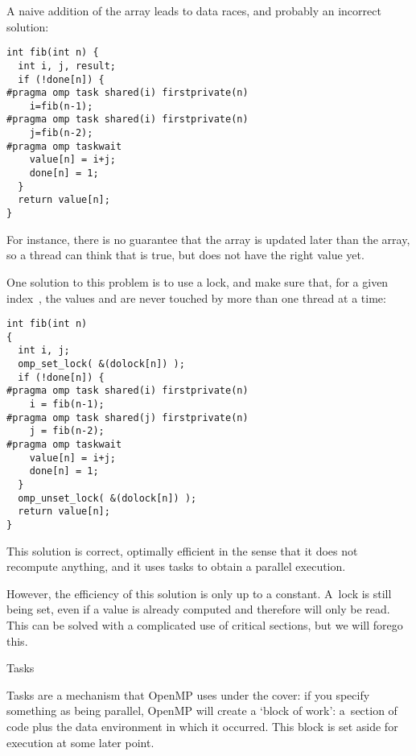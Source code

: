 A naive addition of the  array leads to data races, and probably an
incorrect solution:
\begin{verbatim}
int fib(int n) {
  int i, j, result;
  if (!done[n]) {
#pragma omp task shared(i) firstprivate(n)
    i=fib(n-1);
#pragma omp task shared(i) firstprivate(n)
    j=fib(n-2);
#pragma omp taskwait
    value[n] = i+j;
    done[n] = 1;
  }
  return value[n];
}
\end{verbatim}
For instance, there is no guarantee that the  array is updated
later than the  array, so a thread can think that 
is true, but  does not have the right value yet.

One solution to this problem is to use a lock, and make sure that,
for a given index~, the values  and 
are never touched by more than one thread at a time:
\begin{verbatim}
int fib(int n)
{
  int i, j;
  omp_set_lock( &(dolock[n]) );
  if (!done[n]) {
#pragma omp task shared(i) firstprivate(n)
    i = fib(n-1);
#pragma omp task shared(j) firstprivate(n)
    j = fib(n-2);
#pragma omp taskwait
    value[n] = i+j;
    done[n] = 1;
  }
  omp_unset_lock( &(dolock[n]) );
  return value[n];
}
\end{verbatim}
This solution is correct, optimally efficient in the sense that it
does not recompute anything, and it uses tasks to obtain a parallel execution.

However, the efficiency of this solution is only up to a constant.
A~lock is still being set, even if a value is already computed and therefore
will only be read. This can be solved with a complicated use of critical sections,
but we will forego this.



 {Tasks}

Tasks are a mechanism that OpenMP uses under the cover:
if you specify something as being parallel, OpenMP will create
a `block of work': a~section of code plus the data environment
in which it occurred. This block is set aside for execution at some later point.

